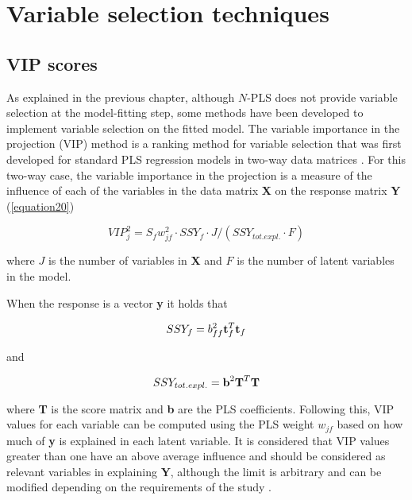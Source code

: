 \chapter{Variable selection techniques}

\section{VIP scores}
As explained in the previous chapter, although $N$-PLS does not provide variable selection at the model-fitting step, some methods have been developed to implement variable selection on the fitted model. The variable importance in the projection (VIP) method is a ranking method for variable selection that was first developed for standard PLS regression models in two-way data matrices \parencite{wold2001pls, chong2005performance}. For this two-way case, the variable importance in the projection is a measure of the influence of each of the variables in the data matrix \textbf{X} on the response matrix \textbf{Y} (\autoref{equation20})

\begin{equation}
VIP^2_j=S_fw^2_{jf} \cdot SSY_f \cdot J/(SSY_{tot.expl.} \cdot F)
\label{equation20}
\end{equation}

where $J$ is the number of variables in \textbf{X} and $F$ is the number of latent variables in the model. 

When the response is a vector \textbf{y} it holds that

\begin{equation}
SSY_f=b^2_{ff}\textbf{\text{t}}_f^T\textbf{\text{t}}_f
\label{equation21}
\end{equation}

and

\begin{equation}
SSY_{tot.expl.}=\textbf{\text{b}}^2\textbf{\text{T}}^T\textbf{\text{T}}
\label{equation22}
\end{equation}

where \textbf{T} is the score matrix and \textbf{b} are the PLS coefficients. Following this, VIP values for each variable can be computed using the PLS weight $w_{jf}$ based on how much of \textbf{y} is explained in each latent variable. It is considered that VIP values greater than one have an above average influence and should be considered as relevant variables in explaining \textbf{Y}, although the limit is arbitrary and can be modified depending on the requirements of the study \parencite{akarachantachote2014cutoff}.

